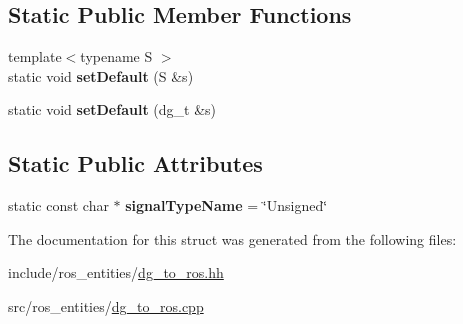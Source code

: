 \subsection*{Static Public Member Functions}
\begin{DoxyCompactItemize}
\item 
{\footnotesize template$<$typename S $>$ }\\static void {\bfseries set\+Default} (S \&s)\hypertarget{structdynamic__graph_1_1DgToRos_3_01unsigned_01int_01_4_abfb90bc3d058b0fa0fbdf330f9f5d1a2}{}\label{structdynamic__graph_1_1DgToRos_3_01unsigned_01int_01_4_abfb90bc3d058b0fa0fbdf330f9f5d1a2}

\item 
static void {\bfseries set\+Default} (dg\+\_\+t \&s)\hypertarget{structdynamic__graph_1_1DgToRos_3_01unsigned_01int_01_4_a66d4d5c633e9930bd93ac4dff834df35}{}\label{structdynamic__graph_1_1DgToRos_3_01unsigned_01int_01_4_a66d4d5c633e9930bd93ac4dff834df35}

\end{DoxyCompactItemize}
\subsection*{Static Public Attributes}
\begin{DoxyCompactItemize}
\item 
static const char $\ast$ {\bfseries signal\+Type\+Name} = \char`\"{}Unsigned\char`\"{}\hypertarget{structdynamic__graph_1_1DgToRos_3_01unsigned_01int_01_4_a90b168f7b37e418e8c5ad1825c5abb36}{}\label{structdynamic__graph_1_1DgToRos_3_01unsigned_01int_01_4_a90b168f7b37e418e8c5ad1825c5abb36}

\end{DoxyCompactItemize}


The documentation for this struct was generated from the following files\+:\begin{DoxyCompactItemize}
\item 
include/ros\+\_\+entities/\hyperlink{dg__to__ros_8hh}{dg\+\_\+to\+\_\+ros.\+hh}\item 
src/ros\+\_\+entities/\hyperlink{dg__to__ros_8cpp}{dg\+\_\+to\+\_\+ros.\+cpp}\end{DoxyCompactItemize}
